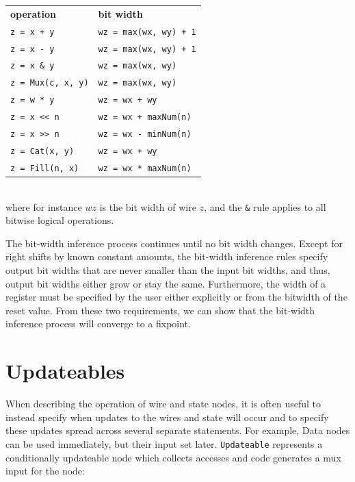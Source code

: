 \documentclass[10pt,twocolumn]{article}
\def\code#1{{\small\tt #1}}
\begin{document}
{\small
\begin{tabular}{ll}
{\bf operation} & {\bf bit width} \\ 
\verb|z = x + y| & \verb|wz = max(wx, wy) + 1| \\
\verb+z = x - y+ & \verb|wz = max(wx, wy) + 1|\\
\verb+z = x & y+ & \verb+wz = max(wx, wy)+ \\
\verb+z = Mux(c, x, y)+ & \verb+wz = max(wx, wy)+ \\
\verb+z = w * y+ & \verb!wz = wx + wy! \\
\verb+z = x << n+ & \verb!wz = wx + maxNum(n)! \\
\verb+z = x >> n+ & \verb+wz = wx - minNum(n)+ \\
\verb+z = Cat(x, y)+ & \verb!wz = wx + wy! \\
\verb+z = Fill(n, x)+ & \verb+wz = wx * maxNum(n)+ \\
\end{tabular}
}
\\[1mm]
\noindent  
where for instance $wz$ is the bit width of wire $z$, and the \verb+&+
rule applies to all bitwise logical operations.

The bit-width inference process continues until no bit width changes.
Except for right shifts by known constant amounts, the bit-width
inference rules specify output bit widths that are never smaller than
the input bit widths, and thus, output bit widths either grow or stay
the same.  Furthermore, the width of a register must be specified by
the user either explicitly or from the bitwidth of the reset value.
From these two requirements, we can show that the bit-width inference
process will converge to a fixpoint.

\section{Updateables}

\label{sec:wires}

When describing the operation of wire and state
nodes, it is often useful to instead specify when updates to the
wires and state will occur and to specify these updates spread across
several separate statements.  
For example, Data nodes can be used immediately, but their input set later.
\code{Updateable} represents a conditionally updateable node which
collects accesses and code generates a mux input for the node:
\end{document}
